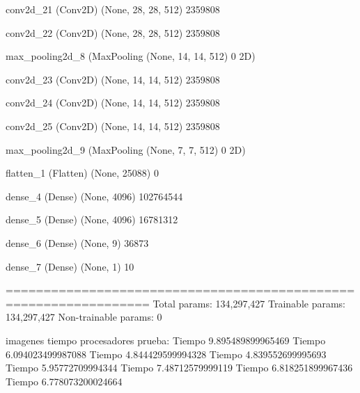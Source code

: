 \documentclass[11pt, a4paper]{article} %
\begin{document}
 conv2d_21 (Conv2D)          (None, 28, 28, 512)       2359808   
                                                                 
 conv2d_22 (Conv2D)          (None, 28, 28, 512)       2359808   
                                                                 
 max_pooling2d_8 (MaxPooling  (None, 14, 14, 512)      0         
 2D)                                                             
                                                                 
 conv2d_23 (Conv2D)          (None, 14, 14, 512)       2359808   
                                                                 
 conv2d_24 (Conv2D)          (None, 14, 14, 512)       2359808   
                                                                 
 conv2d_25 (Conv2D)          (None, 14, 14, 512)       2359808   
                                                                 
 max_pooling2d_9 (MaxPooling  (None, 7, 7, 512)        0         
 2D)                                                             
                                                                 
 flatten_1 (Flatten)         (None, 25088)             0         
                                                                 
 dense_4 (Dense)             (None, 4096)              102764544 
                                                                 
 dense_5 (Dense)             (None, 4096)              16781312  
                                                                 
 dense_6 (Dense)             (None, 9)                 36873     
                                                                 
 dense_7 (Dense)             (None, 1)                 10        
                                                                 
=================================================================
Total params: 134,297,427
Trainable params: 134,297,427
Non-trainable params: 0


imagenes tiempo procesadores prueba:
Tiempo 9.895489899965469
Tiempo 6.094023499987088
Tiempo 4.844429599994328
Tiempo 4.839552699995693
Tiempo 5.95772709994344
Tiempo 7.48712579999119
Tiempo 6.818251899967436
Tiempo 6.778073200024664
\end{document}
